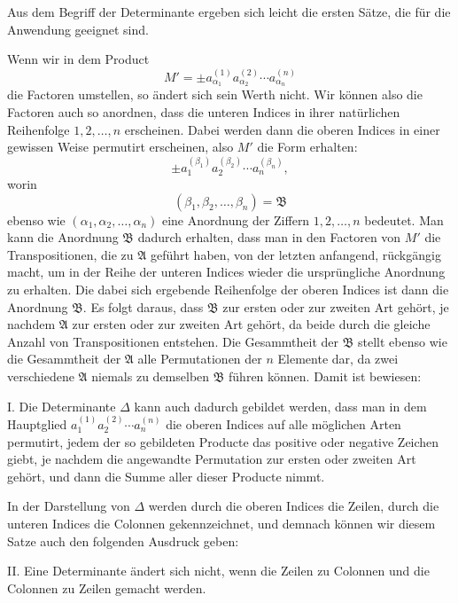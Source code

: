 \documentclass[11pt]{article}
\begin{document}
Aus dem Begriff der Determinante ergeben sich leicht die ersten Sätze, die für die Anwendung geeignet sind.

Wenn wir in dem Product
\begin{equation}
M'=\pm a_{\alpha_1}^{(1)}a_{\alpha_2}^{(2)}\cdots a_{\alpha_n}^{(n)}
\tag{1}
\end{equation}
die Factoren umstellen, so ändert sich sein Werth nicht. Wir können also die Factoren auch so anordnen, dass die unteren Indices in ihrer natürlichen Reihenfolge \(1,2,\ldots,n\) erscheinen. Dabei werden dann die oberen Indices in einer gewissen Weise permutirt erscheinen, also \(M'\) die Form erhalten:
\begin{equation}
\pm a_1^{(\beta_1)}a_2^{(\beta_2)}\cdots a_n^{(\beta_n)},
\tag{2}
\end{equation}
worin
\[
(\beta_1,\beta_2,\ldots,\beta_n)=\mathfrak B
\]
ebenso wie \((\alpha_1,\alpha_2,\ldots,\alpha_n)\) eine Anordnung der Ziffern \(1,2,\ldots,n\) bedeutet. Man kann die Anordnung \(\mathfrak B\) dadurch erhalten, dass man in den Factoren von \(M'\) die Transpositionen, die zu \(\mathfrak A\) geführt haben, von der letzten anfangend, rückgängig macht, um in der Reihe der unteren Indices wieder die ursprüngliche Anordnung zu erhalten. Die dabei sich ergebende Reihenfolge der oberen Indices ist dann die Anordnung \(\mathfrak B\). Es folgt daraus, dass \(\mathfrak B\) zur ersten oder zur zweiten Art gehört, je nachdem \(\mathfrak A\) zur ersten oder zur zweiten Art gehört, da beide durch die gleiche Anzahl von Transpositionen entstehen. Die Gesammtheit der \(\mathfrak B\) stellt ebenso wie die Gesammtheit der \(\mathfrak A\) alle Permutationen der \(n\) Elemente dar, da zwei verschiedene \(\mathfrak A\) niemals zu demselben \(\mathfrak B\) führen können. Damit ist bewiesen:

I. Die Determinante \(\Delta\) kann auch dadurch gebildet werden, dass man in dem Hauptglied \(a_1^{(1)}a_2^{(2)}\cdots a_n^{(n)}\) die oberen Indices auf alle möglichen Arten permutirt, jedem der so gebildeten Producte das positive oder negative Zeichen giebt, je nachdem die angewandte Permutation zur ersten oder zweiten Art gehört, und dann die Summe aller dieser Producte nimmt.

In der Darstellung von \(\Delta\) werden durch die oberen Indices die Zeilen, durch die unteren Indices die Colonnen gekennzeichnet, und demnach können wir diesem Satze auch den folgenden Ausdruck geben:

II. Eine Determinante ändert sich nicht, wenn die Zeilen zu Colonnen und die Colonnen zu Zeilen gemacht werden.
\end{document}
